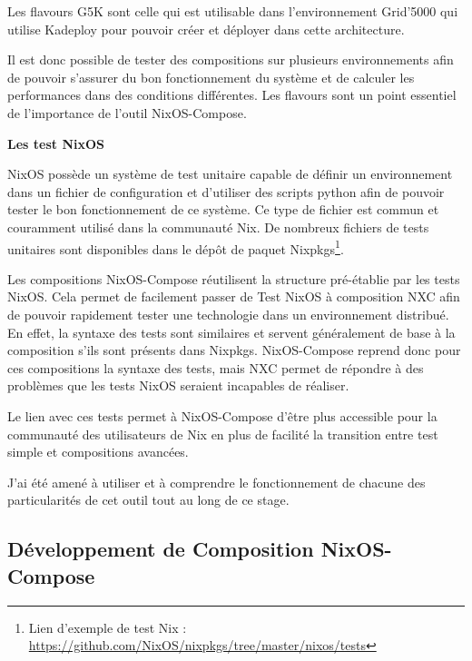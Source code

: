 \documentclass[a4paper,french,12pt, titlepage]{article}
\begin{document}
Les flavours G5K sont celle qui est utilisable dans l'environnement
Grid'5000 qui utilise Kadeploy \cite{kadeploy2011} pour pouvoir créer et
déployer dans cette architecture.\newline

Il est donc possible de tester des compositions sur plusieurs
environnements afin de pouvoir s'assurer du bon fonctionnement du
système et de calculer les performances dans des conditions différentes.
Les flavours sont un point essentiel de l'importance de l'outil
NixOS-Compose.\newline

\textbf{Les test NixOS}\newline

NixOS possède un système de test unitaire capable de définir un
environnement dans un fichier de configuration et d'utiliser des scripts
python afin de pouvoir tester le bon fonctionnement de ce système. Ce
type de fichier est commun et couramment utilisé dans la communauté Nix.
De nombreux fichiers de tests unitaires sont disponibles dans le dépôt
de paquet
Nixpkgs\footnote{Lien d'exemple de test Nix : \url{https://github.com/NixOS/nixpkgs/tree/master/nixos/tests}}.\newline

Les compositions NixOS-Compose réutilisent la structure pré-établie par
les tests NixOS. Cela permet de facilement passer de Test NixOS à
composition NXC afin de pouvoir rapidement tester une technologie dans
un environnement distribué. En effet, la syntaxe des tests sont
similaires et servent généralement de base à la composition s'ils sont
présents dans Nixpkgs. NixOS-Compose reprend donc pour ces compositions
la syntaxe des tests, mais NXC permet de répondre à des problèmes que
les tests NixOS seraient incapables de réaliser.\newline

Le lien avec ces tests permet à NixOS-Compose d'être plus accessible
pour la communauté des utilisateurs de Nix en plus de facilité la
transition entre test simple et compositions avancées.\newline

J'ai été amené à utiliser et à comprendre le fonctionnement de chacune
des particularités de cet outil tout au long de ce stage.\newline

\newpage

\hypertarget{duxe9veloppement-de-composition-nixos-compose}{%
\subsection{Développement de Composition
NixOS-Compose}\label{duxe9veloppement-de-composition-nixos-compose}}
\end{document}
